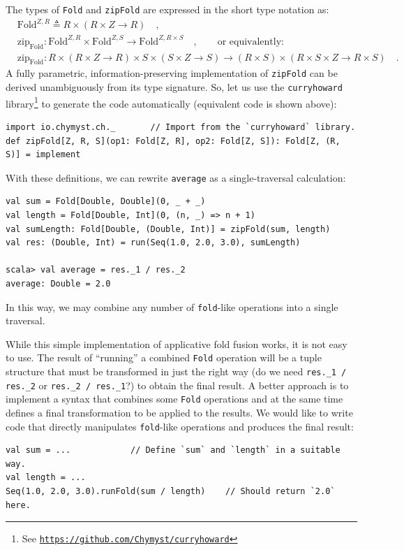 The types of \lstinline!Fold! and \lstinline!zipFold! are expressed
in the short type notation as:
\begin{align*}
 & \text{Fold}^{Z,R}\triangleq R\times\left(R\times Z\rightarrow R\right)\quad,\\
 & \text{zip}_{\text{Fold}}:\text{Fold}^{Z,R}\times\text{Fold}^{Z,S}\rightarrow\text{Fold}^{Z,R\times S}\quad,\quad\quad\text{or equivalently:}\\
 & \text{zip}_{\text{Fold}}:R\times\left(R\times Z\rightarrow R\right)\times S\times\left(S\times Z\rightarrow S\right)\rightarrow\left(R\times S\right)\times(R\times S\times Z\rightarrow R\times S)\quad.
\end{align*}
A fully parametric, information-preserving implementation of \lstinline!zipFold!
can be derived unambiguously from its type signature. So, let us use
the \lstinline!curryhoward!
library\footnote{See \texttt{\href{https://github.com/Chymyst/curryhoward}{https://github.com/Chymyst/curryhoward}}}
to generate the code automatically (equivalent code is shown above):
\begin{lstlisting}
import io.chymyst.ch._       // Import from the `curryhoward` library.
def zipFold[Z, R, S](op1: Fold[Z, R], op2: Fold[Z, S]): Fold[Z, (R, S)] = implement
\end{lstlisting}

With these definitions, we can rewrite \lstinline!average! as a single-traversal
calculation:
\begin{lstlisting}
val sum = Fold[Double, Double](0, _ + _)
val length = Fold[Double, Int](0, (n, _) => n + 1)
val sumLength: Fold[Double, (Double, Int)] = zipFold(sum, length)
val res: (Double, Int) = run(Seq(1.0, 2.0, 3.0), sumLength)

scala> val average = res._1 / res._2
average: Double = 2.0
\end{lstlisting}
In this way, we may combine any number of \lstinline!fold!-like operations
into a single traversal. 

While this simple implementation of applicative fold fusion works,
it is not easy to use. The result of \textsf{``}running\textsf{''} a combined \lstinline!Fold!
operation will be a tuple structure that must be transformed in just
the right way (do we need \lstinline!res._1 / res._2! or \lstinline!res._2 / res._1!?)
to obtain the final result. A better approach is to implement a syntax
that combines some \lstinline!Fold! operations and at the same time
defines a final transformation to be applied to the results. We would
like to write code that directly manipulates \lstinline!fold!-like
operations and produces the final result:
\begin{lstlisting}
val sum = ...            // Define `sum` and `length` in a suitable way.
val length = ...
Seq(1.0, 2.0, 3.0).runFold(sum / length)    // Should return `2.0` here.
\end{lstlisting}

